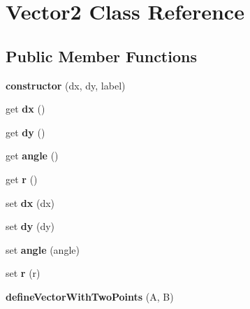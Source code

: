 \hypertarget{class_vector2}{}\section{Vector2 Class Reference}
\label{class_vector2}
\subsection*{Public Member Functions}
\begin{DoxyCompactItemize}
\item 
\mbox{\label{class_vector2_a7560313c3dc1803cb3cd388190316df8}} 
{\bfseries constructor} (dx, dy, label)
\item 
\mbox{\label{class_vector2_aecd730696b56c5b283c7b21018097edc}} 
get {\bfseries dx} ()
\item 
\mbox{\label{class_vector2_a452b681afc86c96a1fddccb4dc70364a}} 
get {\bfseries dy} ()
\item 
\mbox{\label{class_vector2_a6a48247b8e318386d1cf84916880c29f}} 
get {\bfseries angle} ()
\item 
\mbox{\label{class_vector2_a8af9aef333eb2db00bf2f31c53684e5b}} 
get {\bfseries r} ()
\item 
\mbox{\label{class_vector2_a6b20c1d77867b8724b8108a613793cf8}} 
set {\bfseries dx} (dx)
\item 
\mbox{\label{class_vector2_a7789e1159281637ed7ced846b7cfed18}} 
set {\bfseries dy} (dy)
\item 
\mbox{\label{class_vector2_aff082ead0633cfa3c0e9522ee8a69de0}} 
set {\bfseries angle} (angle)
\item 
\mbox{\label{class_vector2_aef630f9c7e539792ae2e783a12808a78}} 
set {\bfseries r} (r)
\item 
\mbox{\label{class_vector2_a9b9a5275c7c3807634d2acfe65e7d764}} 
{\bfseries define\+Vector\+With\+Two\+Points} (A, B)
\item 
\mbox{\label{class_vector2_aacbad664ab2f243543f507aad53a26ba}} 

\end{DoxyCompactItemize}
